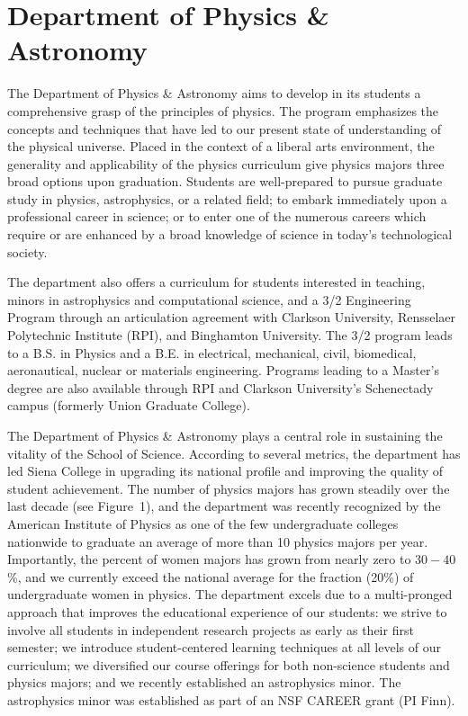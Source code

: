 \documentclass[11pt, preprint]{aastex}
\begin{document}
\section{Department of Physics \& Astronomy}
The Department of Physics \& Astronomy aims to develop in its students a
comprehensive grasp of the principles of physics. The program emphasizes the
concepts and techniques that have led to our present state of understanding of
the physical universe. Placed in the context of a liberal arts environment, the
generality and applicability of the physics curriculum give physics majors three
broad options upon graduation. Students are well-prepared to pursue graduate
study in physics, astrophysics, or a related field; to embark immediately upon a
professional career in science; or to enter one of the numerous careers which
require or are enhanced by a broad knowledge of science in today's technological
society.
					
The department also offers a curriculum for students interested in teaching,
minors in astrophysics and computational science, and a 3/2 Engineering Program
through an articulation agreement with Clarkson University, Rensselaer
Polytechnic Institute (RPI), and Binghamton University.  The 3/2 program leads
to a B.S. in Physics and a B.E. in electrical, mechanical, civil, biomedical,
aeronautical, nuclear or materials engineering.  Programs leading to a Master’s
degree are also available through RPI and Clarkson University's
Schenectady campus (formerly Union Graduate College).  %



The Department of Physics \& Astronomy plays a central role in
sustaining the vitality of the School of Science. According to several metrics, the department has
led Siena College in upgrading its national profile and improving the
quality of student achievement. The number of physics majors has grown
steadily over the last decade (see Figure~1), and the department was recently
recognized by the American Institute of Physics as one of the few
undergraduate colleges nationwide to graduate an average of more
than 10 physics majors per year. Importantly, the percent of women
majors has grown from nearly zero to $30 - 40$\%, and we currently exceed
the national average for the fraction (20\%) of undergraduate women in
 physics. The department excels due to a multi-pronged approach that
 improves the educational experience of our students: we strive to
 involve all students in independent research projects as early as their
 first semester; we introduce student-centered learning techniques at all levels of our curriculum; we
 diversified our course offerings for both non-science students and
 physics majors; and we recently established an astrophysics minor.
The astrophysics minor was established as part of an NSF CAREER grant
(PI Finn).
		
\end{document}
